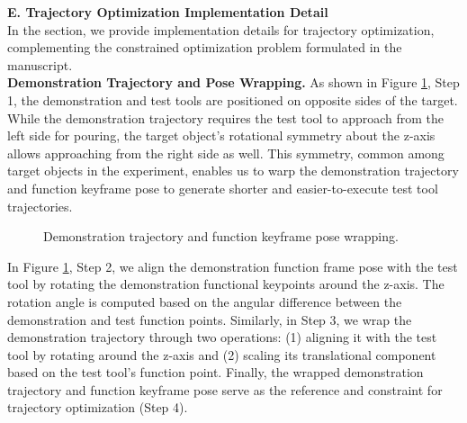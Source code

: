 \newpage













\noindent \textbf{E. Trajectory Optimization Implementation Detail} \\
In the section, we provide implementation details for trajectory optimization, complementing the constrained optimization problem  formulated in the manuscript.  \\

\noindent \textbf{Demonstration Trajectory and Pose Wrapping.} As shown in Figure \ref{fig:init_align}, Step 1, the demonstration and test tools are positioned on opposite sides of the target. While the demonstration trajectory requires the test tool to approach from the left side for pouring, the target object’s rotational symmetry about the z-axis allows approaching from the right side as well. This symmetry, common among target objects in the experiment, enables us to warp the demonstration trajectory and function keyframe pose to generate shorter and easier-to-execute test tool trajectories.

\begin{figure}[h]
  \centering
    \vspace*{-0.1in}
  \caption{Demonstration trajectory and function keyframe pose wrapping.}
  \label{fig:init_align}
\end{figure}

\noindent In Figure \ref{fig:init_align}, Step 2, we align the demonstration function frame pose with the test tool by rotating the demonstration functional keypoints around the z-axis. The rotation angle is computed based on the angular difference between the demonstration and test function points. Similarly, in Step 3, we wrap the demonstration trajectory through two operations:  (1) aligning it with the test tool by rotating around the z-axis and (2) scaling its translational component based on the test tool’s function point. Finally, the wrapped demonstration trajectory and function keyframe pose serve as the reference and constraint for trajectory optimization (Step 4).  \\

